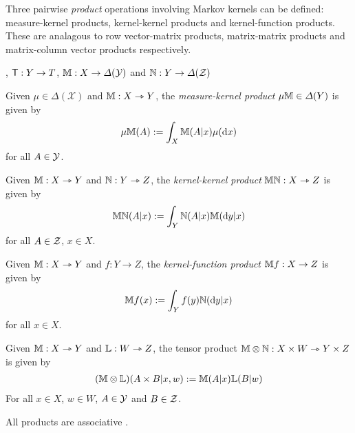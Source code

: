 Three pairwise \emph{product} operations involving Markov kernels can be defined: measure-kernel products, kernel-kernel products and kernel-function products. These are analagous to row vector-matrix products, matrix-matrix products and matrix-column vector products respectively.

 , $\mathsf{T}:Y\to T$, $\mathbb{M}:X\to \Delta(\mathcal{Y})$ and $\mathbb{N}:Y\to \Delta(\mathcal{Z})$

\begin{definition}
Given $\mu\in \Delta(\mathcal{X})$ and $\mathbb{M}:X\rightarrowtriangle Y$, the \emph{measure-kernel product} $\mu\mathbb{M}\in \Delta(Y)$ is given by
\begin{align}
\mu\mathbb{M} (A) := \int_X \mathbb{M}(A|x) \mu(\mathrm{d}x)
\end{align}
for all $A\in \mathcal{Y}$.
\end{definition}

\begin{definition}
Given $\mathbb{M}:X\rightarrowtriangle Y$ and $\mathbb{N}:Y\rightarrowtriangle Z$, the \emph{kernel-kernel product} $\mathbb{M}\mathbb{N}:X\rightarrowtriangle Z$ is given by
\begin{align}
\mathbb{MN} (A|x) := \int_Y \mathbb{N}(A|x) \mathbb{M}(\mathrm{d}y|x)
\end{align}
for all $A\in \mathcal{Z}$, $x\in X$.
\end{definition}

\begin{definition}
Given $\mathbb{M}:X\rightarrowtriangle Y$ and $f:Y\to Z$, the \emph{kernel-function product} $\mathbb{M}f:X\to Z$ is given by
\begin{align}
\mathbb{M}f (x) := \int_Y f(y)\mathbb{N}(\mathrm{d}y|x)
\end{align}
for all $x\in X$.
\end{definition}

\begin{definition}
Given $\mathbb{M}:X\rightarrowtriangle Y$ and $\mathbb{L}:W\rightarrowtriangle Z$, the tensor product $\mathbb{M}\otimes\mathbb{N}:X\times W\rightarrowtriangle Y\times Z$ is given by
\begin{align}
	(\mathbb{M}\otimes\mathbb{L})(A\times B|x,w):=\mathbb{M}(A|x)\mathbb{L}(B|w)
\end{align}
For all $x\in X$, $w\in W$, $A\in \mathcal{Y}$ and $B\in \mathcal{Z}$.
\end{definition}

All products are associative \citep[Chapter 1]{cinlar_probability_2011}.

